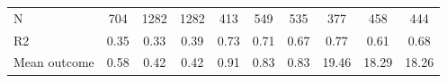 \begin{tabular}{lccc|ccc|ccc}
N           &         704         &        1282         &        1282         &         413         &         549         &         535         &         377         &         458         &         444         \\
R2          &        0.35         &        0.33         &        0.39         &        0.73         &        0.71         &        0.67         &        0.77         &        0.61         &        0.68         \\
Mean outcome&        0.58         &        0.42         &        0.42         &        0.91         &        0.83         &        0.83         &       19.46         &       18.29         &       18.26         \\
\bottomrule \end{tabular}
